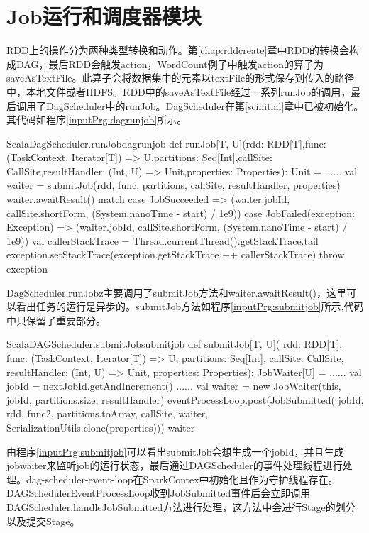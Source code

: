 \chapter{Job运行和调度器模块}
\label{jobrunning}
RDD上的操作分为两种类型转换和动作。第\ref{chap:rddcreate}章中RDD的转换会构成DAG，最后RDD会触发action，WordCount例子中触发action的算子为saveAsTextFile。此算子会将数据集中的元素以textFile的形式保存到传入的路径中，本地文件或者HDFS。RDD中的saveAsTextFile经过一系列runJob的调用，最后调用了DagScheduler中的runJob。DagScheduler在第\ref{scinitial}章中已被初始化。其代码如程序\ref{inputPrg:dagrunjob}所示。
\begin{codeInput}{Scala}{DagScheduler.runJob}{dagrunjob}
def runJob[T, U](rdd: RDD[T],func: (TaskContext, Iterator[T]) => U,partitions: Seq[Int],callSite: CallSite,resultHandler: (Int, U) => Unit,properties: Properties): Unit = {
  ......
  val waiter = submitJob(rdd, func, partitions, callSite, resultHandler, properties)
  waiter.awaitResult() match {
    case JobSucceeded =>
      (waiter.jobId, callSite.shortForm, (System.nanoTime - start) / 1e9))
    case JobFailed(exception: Exception) =>
      (waiter.jobId, callSite.shortForm, (System.nanoTime - start) / 1e9))
      val callerStackTrace = Thread.currentThread().getStackTrace.tail
      exception.setStackTrace(exception.getStackTrace ++ callerStackTrace)
      throw exception
  }
}
\end{codeInput}

DagScheduler.runJobz主要调用了submitJob方法和waiter.awaitResult()，这里可以看出任务的运行是异步的。submitJob方法如程序\ref{inputPrg:submitjob}所示,代码中只保留了重要部分。
\begin{codeInput}{Scala}{DAGScheduler.submitJob}{submitjob}
def submitJob[T, U](
rdd: RDD[T],
func: (TaskContext, Iterator[T]) => U,
partitions: Seq[Int],
callSite: CallSite,
resultHandler: (Int, U) => Unit,
properties: Properties): JobWaiter[U] = {
......
val jobId = nextJobId.getAndIncrement()
......
val waiter = new JobWaiter(this, jobId, partitions.size, resultHandler)
eventProcessLoop.post(JobSubmitted(
  jobId, rdd, func2, partitions.toArray, callSite, waiter,
  SerializationUtils.clone(properties)))
  waiter
}
\end{codeInput}

由程序\ref{inputPrg:submitjob}可以看出submitJob会想生成一个jobId，并且生成jobwaiter来监听job的运行状态，最后通过DAGScheduler的事件处理线程进行处理。dag-scheduler-event-loop在SparkContex中初始化且作为守护线程存在。DAGSchedulerEventProcessLoop收到JobSubmitted事件后会立即调用DAGScheduler.handleJobSubmitted方法进行处理，这方法中会进行Stage的划分以及提交Stage。
